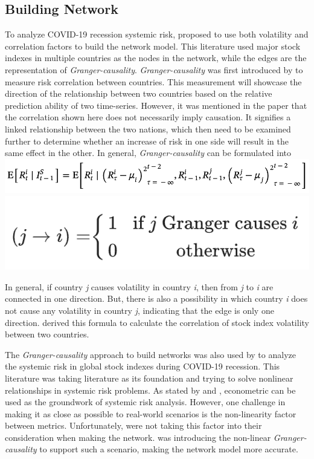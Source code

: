 \documentclass[a4paper,11pt]{article}
\begin{document}
\subsection{Building Network}
To analyze COVID-19 recession systemic risk, \cite{Lai_Hu_2021} proposed to use both volatility and correlation factors to build the network model. This literature used major stock indexes in multiple countries as the nodes in the network, while the edges are the representation of \textit{Granger-causality}. \textit{Granger-causality} was first introduced by \cite{Billio_Getmansky_Lo_Pelizzon_2012} to measure risk correlation between countries. This measurement will showcase the direction of the relationship between two countries based on the relative prediction ability of two time-series. However, it was mentioned in the paper that the correlation shown here does not necessarily imply causation. It signifies a linked relationship between the two nations, which then need to be examined further to determine whether an increase of risk in one side will result in the same effect in the other. In general, \textit{Granger-causality} can be formulated into
\includegraphics[scale=0.5]{granger_causality_1.png}
\includegraphics[scale=0.5]{granger_causality_2.png}

In general, if country \textit{j} causes volatility in country \textit{i}, then from \textit{j} to \textit{i} are connected in one direction. But, there is also a possibility in which country \textit{i} does not cause any volatility in country \textit{j}, indicating that the edge is only one direction. \cite{Lai_Hu_2021} derived this formula to calculate the correlation of stock index volatility between two countries.

The \textit{Granger-causality} approach to build networks was also used by \cite{Zhang_Yin_Sha_2023} to analyze the systemic risk in global stock indexes during COVID-19 recession. This literature was taking \cite{Lai_Hu_2021} literature as its foundation and trying to solve nonlinear relationships in systemic risk problems. As stated by \cite{Chen_Cummins_Viswanathan_Weiss_2013} and \cite{Etesami_Habibnia_Kiyavash_2017}, econometric can be used as the groundwork of systemic risk analysis. However, one challenge in making it as close as possible to real-world scenarios is the non-linearity factor between metrics. Unfortunately, \cite{Lai_Hu_2021} were not taking this factor into their consideration when making the network. \cite{Zhang_Yin_Sha_2023} was introducing the non-linear \textit{Granger-causality} to support such a scenario, making the network model more accurate. 
\end{document}
